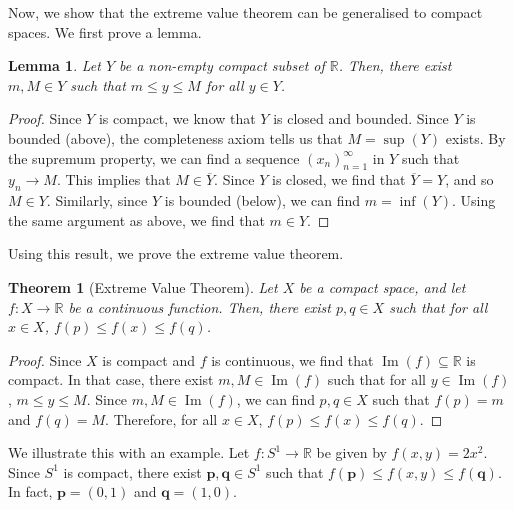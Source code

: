 \documentclass[a4paper, openany]{memoir}
\theoremstyle{definition}
\theoremstyle{plain}
\newtheorem{theorem}[definition]{Theorem}
\newtheorem{lemma}[definition]{Lemma}
\begin{document}
Now, we show that the extreme value theorem can be generalised to compact spaces. We first prove a lemma.
\begin{lemma}
Let $Y$ be a non-empty compact subset of $\mathbb{R}$. Then, there exist $m, M \in Y$ such that $m \leqslant y \leqslant M$ for all $y \in Y$.
\end{lemma}
\begin{proof}
Since $Y$ is compact, we know that $Y$ is closed and bounded. Since $Y$ is bounded (above), the completeness axiom tells us that $M = \sup(Y)$ exists. By the supremum property, we can find a sequence $(x_n)_{n=1}^{\infty}$ in $Y$ such that $y_n \to M$. This implies that $M \in \overline{Y}$. Since $Y$ is closed, we find that $\overline{Y} = Y$, and so $M \in Y$. Similarly, since $Y$ is bounded (below), we can find $m = \inf(Y)$. Using the same argument as above, we find that $m \in Y$.
\end{proof}
\noindent Using this result, we prove the extreme value theorem.
\begin{theorem}[Extreme Value Theorem]
Let $X$ be a compact space, and let $f: X \to \mathbb{R}$ be a continuous function. Then, there exist $p, q \in X$ such that for all $x \in X$, $f(p) \leqslant f(x) \leqslant f(q)$.
\end{theorem}
\begin{proof}
Since $X$ is compact and $f$ is continuous, we find that $\operatorname{Im}(f) \subseteq \mathbb{R}$ is compact. In that case, there exist $m, M \in \operatorname{Im}(f)$ such that for all $y \in \operatorname{Im}(f)$, $m \leqslant y \leqslant M$. Since $m, M \in \operatorname{Im}(f)$, we can find $p, q \in X$ such that $f(p) = m$ and $f(q) = M$. Therefore, for all $x \in X$, $f(p) \leqslant f(x) \leqslant f(q)$.
\end{proof}
\noindent We illustrate this with an example. Let $f: S^1 \to \mathbb{R}$ be given by $f(x, y) = 2x^2$. Since $S^1$ is compact, there exist $\bm{p}, \bm{q} \in S^1$ such that $f(\bm{p}) \leqslant f(x, y) \leqslant f(\bm{q})$. In fact, $\bm{p} = (0, 1)$ and $\bm{q} = (1, 0)$.
\end{document}
